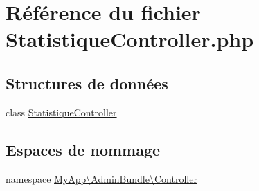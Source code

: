 \hypertarget{_statistique_controller_8php}{\section{Référence du fichier Statistique\-Controller.\-php}
\label{_statistique_controller_8php}
}
\subsection*{Structures de données}
\begin{DoxyCompactItemize}
\item 
class \hyperlink{class_my_app_1_1_admin_bundle_1_1_controller_1_1_statistique_controller}{Statistique\-Controller}
\end{DoxyCompactItemize}
\subsection*{Espaces de nommage}
\begin{DoxyCompactItemize}
\item 
namespace \hyperlink{namespace_my_app_1_1_admin_bundle_1_1_controller}{My\-App\textbackslash{}\-Admin\-Bundle\textbackslash{}\-Controller}
\end{DoxyCompactItemize}
